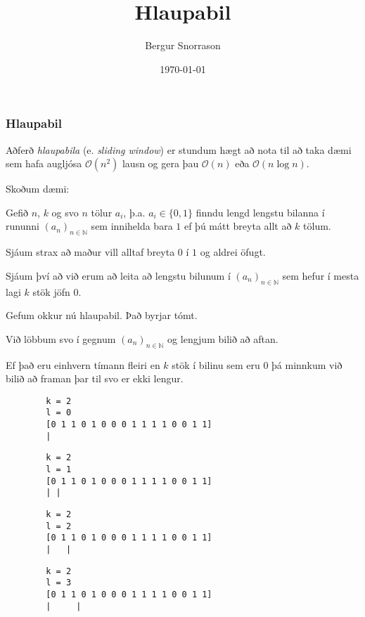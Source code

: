 \title{Hlaupabil}
\author{Bergur Snorrason}
\date{\today}



\frame{\titlepage}

{
	\frametitle{Hlaupabil}
	{
		\item<1-> Aðferð \emph{hlaupabila} (e. \emph{sliding window}) er stundum hægt að nota til að taka
				dæmi sem hafa augljósa $\mathcal{O}(n^2)$ lausn og gera þau $\mathcal{O}(n)$ eða $\mathcal{O}(n\log n)$.
	}
}

{
	{
		\item<1-> Skoðum dæmi:
		\item<2-> Gefið $n$, $k$ og svo $n$ tölur $a_i$, þ.a. $a_i \in \{0, 1\}$ finndu
			lengd lengstu bilanna í rununni $(a_n)_{n \in \mathbb{N}}$ sem innihelda bara $1$ ef þú mátt breyta allt að $k$ tölum.
		\item<3-> Sjáum strax að maður vill alltaf breyta $0$ í $1$ og aldrei öfugt.
		\item<4-> Sjáum því að við erum að leita að lengstu bilunum í $(a_n)_{n \in \mathbb{N}}$ sem hefur í mesta lagi $k$ stök jöfn $0$.
		\item<5-> Gefum okkur nú hlaupabil. Það byrjar tómt.
		\item<6-> Við löbbum svo í gegnum $(a_n)_{n \in \mathbb{N}}$ og lengjum bilið að aftan.
		\item<7-> Ef það eru einhvern tímann fleiri en $k$ stök í bilinu sem eru $0$ þá minnkum við bilið að framan þar til svo er ekki lengur.
	}
}

{ \begin{verbatim}
        k = 2
        l = 0
        [0 1 1 0 1 0 0 0 1 1 1 1 0 0 1 1]
        |
\end{verbatim} }

{ \begin{verbatim}
        k = 2
        l = 1
        [0 1 1 0 1 0 0 0 1 1 1 1 0 0 1 1]
        | |
\end{verbatim} }

{ \begin{verbatim}
        k = 2
        l = 2
        [0 1 1 0 1 0 0 0 1 1 1 1 0 0 1 1]
        |   |
\end{verbatim} }

{ \begin{verbatim}
        k = 2
        l = 3
        [0 1 1 0 1 0 0 0 1 1 1 1 0 0 1 1]
        |     |
\end{verbatim} }

